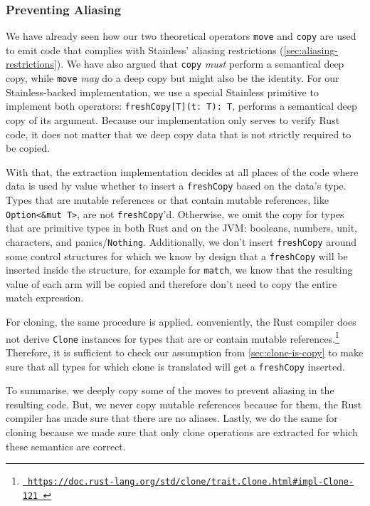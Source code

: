 \subsubsection{Preventing Aliasing}

We have already seen how our two theoretical operators \lstinline!move! and
\lstinline!copy! are used to emit code that complies with Stainless' aliasing
restrictions (\autoref{sec:aliasing-restrictions}). We have also argued that
\lstinline!copy! \emph{must} perform a semantical deep copy, while
\lstinline!move! \emph{may} do a deep copy but might also be the identity. For
our Stainless-backed implementation, we use a special Stainless primitive to
implement both operators: \lstinline!freshCopy[T](t: T): T!, performs a
semantical deep copy of its argument. Because our implementation only serves to
verify Rust code, it does not matter that we deep copy data that is not strictly
required to be copied.

With that, the extraction implementation decides at all places of the code where
data is used by value whether to insert a \lstinline!freshCopy! based on the
data's type. Types that are mutable references or that contain mutable
references, like \lstinline!Option<&mut T>!, are not \lstinline!freshCopy!'d.
Otherwise, we omit the copy for types that are primitive types in both Rust and
on the JVM: booleans, numbers, unit, characters, and panics/\lstinline!Nothing!.
Additionally, we don't insert \lstinline!freshCopy! around some control
structures for which we know by design that a \lstinline!freshCopy! will be
inserted inside the structure, for example for \lstinline!match!, we know that
the resulting value of each arm will be copied and therefore don't need to copy
the entire match expression.

For cloning, the same procedure is applied. conveniently, the Rust compiler does
not derive \lstinline!Clone! instances for types that are or contain mutable
references.\footnote{\href{}{\texttt{\color{MidnightBlue}
https://doc.rust-lang.org/std/clone/trait.Clone.html\#impl-Clone-121 }}}
Therefore, it is sufficient to check our assumption from
\autoref{sec:clone-is-copy} to make sure that all types for which clone is
translated will get a \lstinline!freshCopy! inserted.

To summarise, we deeply copy some of the moves to prevent aliasing in the
resulting code. But, we never copy mutable references because for them, the Rust
compiler has made sure that there are no aliases. Lastly, we do the same for
cloning because we made sure that only clone operations are extracted for which
these semantics are correct.


